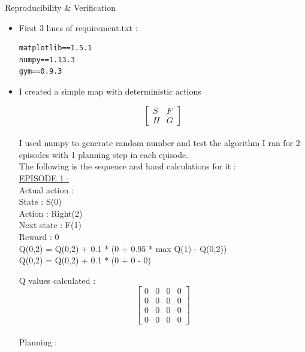 \documentclass[12pt]{article}
\newenvironment{problem}[2][\large Problem]{\begin{trivlist}
\item[\hskip \labelsep {\bfseries #1}\hskip \labelsep {\bfseries #2.}]}{\end{trivlist}}
\begin{document}
\newpage
\begin{problem} {4} Reproducibility \& Verification\\

\begin{itemize}
	\item [(i)] First 3 lines of requirement.txt :
\begin{lstlisting}
matplotlib==1.5.1
numpy==1.13.3
gym==0.9.3
\end{lstlisting}
\item [(ii)] I created a simple map with deterministic actions 

\[\begin{bmatrix}
S & F\\
H & G
\end{bmatrix}\]\\

I used numpy to generate random number and test the algorithm I ran for 2 episodes with 1 planning step in each episode.\\

The following is the sequence and hand calculations for it :\\

\underline{EPISODE 1 :}\\

\hspace*{20pt} Actual action : \\

State : S(0) \\ Action : Right(2) \\ Next state : F(1) \\ Reward : 0\\

\hspace*{20pt} Q(0,2) = Q(0,2) + 0.1 * (0 + 0.95 * max Q(1) - Q(0,2))\\
\hspace*{20pt} Q(0,2) = Q(0,2) + 0.1 * (0 + 0 - 0)

Q values calculated : 
\[\begin{bmatrix}
0 & 0 & 0 & 0\\
0 & 0 & 0 & 0\\
0 & 0 & 0 & 0\\
0 & 0 & 0 & 0
\end{bmatrix}\]\\

\hspace*{20pt} Planning : \\


\end{itemize}
\end{problem}
\end{document}
